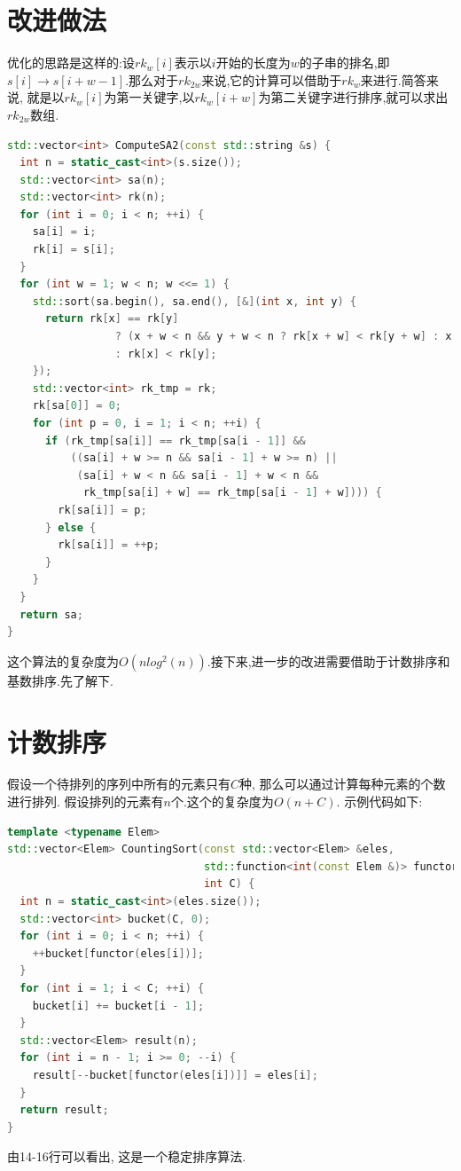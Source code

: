 \documentclass{article}
\begin{document}
\section{改进做法}
优化的思路是这样的:设$rk_{w}[i]$表示以$i$开始的长度为$w$的子串的排名,即$s[i]\rightarrow s[i+w-1]$.那么对于$rk_{2w}$来说,它的计算可以借助于$rk_{w}$来进行.简答来说, 就是以$rk_{w}[i]$为第一关键字,以$rk_{w}[i+w]$为第二关键字进行排序,就可以求出$rk_{2w}$数组.
\begin{lstlisting}[language=C++, caption={Better}]
std::vector<int> ComputeSA2(const std::string &s) {
  int n = static_cast<int>(s.size());
  std::vector<int> sa(n);
  std::vector<int> rk(n);
  for (int i = 0; i < n; ++i) {
    sa[i] = i;
    rk[i] = s[i];
  }
  for (int w = 1; w < n; w <<= 1) {
    std::sort(sa.begin(), sa.end(), [&](int x, int y) {
      return rk[x] == rk[y]
                 ? (x + w < n && y + w < n ? rk[x + w] < rk[y + w] : x + w >= n)
                 : rk[x] < rk[y];
    });
    std::vector<int> rk_tmp = rk;
    rk[sa[0]] = 0;
    for (int p = 0, i = 1; i < n; ++i) {
      if (rk_tmp[sa[i]] == rk_tmp[sa[i - 1]] &&
          ((sa[i] + w >= n && sa[i - 1] + w >= n) ||
           (sa[i] + w < n && sa[i - 1] + w < n &&
            rk_tmp[sa[i] + w] == rk_tmp[sa[i - 1] + w]))) {
        rk[sa[i]] = p;
      } else {
        rk[sa[i]] = ++p;
      }
    }
  }
  return sa;
}
\end{lstlisting}
这个算法的复杂度为$O(nlog^{2}(n))$.接下来,进一步的改进需要借助于计数排序和基数排序.先了解下.

\section{计数排序}
假设一个待排列的序列中所有的元素只有$C$种, 那么可以通过计算每种元素的个数进行排列. 假设排列的元素有$n$个.这个的复杂度为$O(n+C)$. 示例代码如下: \par
\begin{lstlisting}[language=C++, caption={Counting Sort}]
template <typename Elem>
std::vector<Elem> CountingSort(const std::vector<Elem> &eles,
                               std::function<int(const Elem &)> functor,
                               int C) {
  int n = static_cast<int>(eles.size());
  std::vector<int> bucket(C, 0);
  for (int i = 0; i < n; ++i) {
    ++bucket[functor(eles[i])];
  }
  for (int i = 1; i < C; ++i) {
    bucket[i] += bucket[i - 1];
  }
  std::vector<Elem> result(n);
  for (int i = n - 1; i >= 0; --i) {
    result[--bucket[functor(eles[i])]] = eles[i];
  }
  return result;
}
\end{lstlisting}
由14-16行可以看出, 这是一个稳定排序算法.
\end{document}
